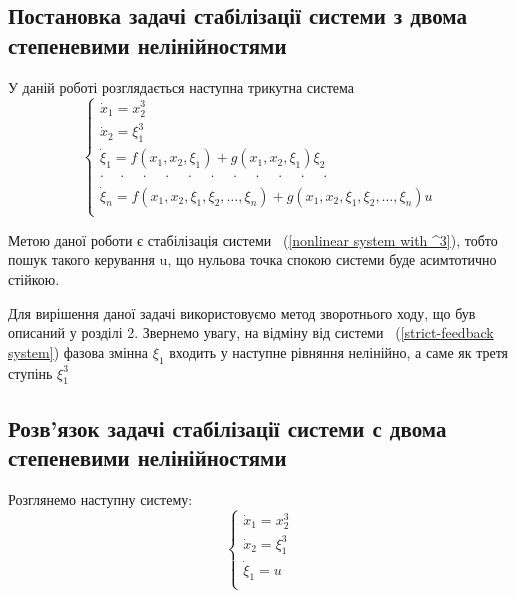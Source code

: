 \documentclass{article}
\begin{document}
\subsection{Постановка задачі стабілізації системи з двома степеневими нелінійностями}
У даній роботі розглядається наступна трикутна система
\begin{equation}\label{nonlinear system with ^3}
    \begin{cases}
    \dot x_1 = x_2^3 \\
    \dot x_2 = \xi_1^3\\
    \dot \xi_1 = f(x_1, x_2,\xi_1) + g(x_1, x_2, \xi_1)\xi_2 \\
    \cdot \quad \cdot \quad \cdot \quad \cdot  \quad \cdot  \quad \cdot
    \quad \cdot  \quad \cdot  \quad \cdot  \quad \cdot  \quad \cdot\\
    \dot \xi_n = f(x_1, x_2,\xi_1,\xi_2, \dots, \xi_n) + 
    g(x_1, x_2, \xi_1,\xi_2, \dots, \xi_n)u \\
    \end{cases}
\end{equation}

Метою даної роботи є стабілізація системи ~(\ref{nonlinear system with ^3}), тобто пошук такого
керування u, що нульова точка спокою системи буде асимтотично стійкою. 

Для вирішення даної задачі
використовуємо метод зворотнього ходу, що був описаний у розділі 2. Звернемо увагу, на відміну від 
системи ~(\ref{strict-feedback system}) фазова змінна $\xi_1$ входить у наступне рівняння нелінійно,
а саме як третя ступінь $\xi_1^3$
\pagebreak


\subsection{Розв'язок задачі стабілізації системи с двома степеневими нелінійностями}
Розглянемо наступну систему:
\begin{equation}\label{3dim nonlinear system}
    \begin{cases}
    \dot x_1 = x_2^3 \\
    \dot x_2 = \xi_1^3\\
    \dot \xi_1 = u\\
    \end{cases}
\end{equation}
\end{document}
